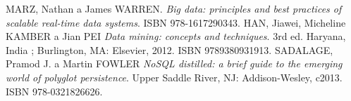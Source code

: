 \begin{thebibliography}{99}
MARZ, Nathan a James WARREN.
\textit{Big data: principles and best practices of scalable real-time data systems}.
ISBN 978-1617290343.
HAN, Jiawei, Micheline KAMBER a Jian PEI
\textit{Data mining: concepts and techniques}.
3rd ed. Haryana, India ; Burlington, MA: Elsevier, 2012. ISBN 9789380931913.
SADALAGE, Pramod J. a Martin FOWLER
\textit{NoSQL distilled: a brief guide to the emerging world of polyglot persistence}.
Upper Saddle River, NJ: Addison-Wesley, c2013. ISBN 978-0321826626.

\end{thebibliography}
